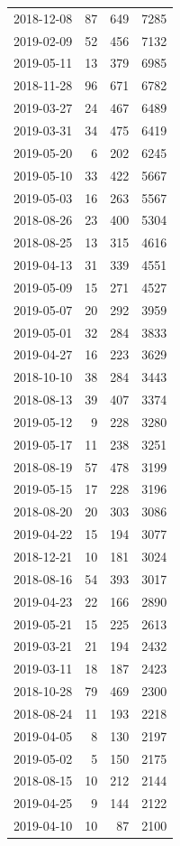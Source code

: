 \begin{tabular}{lrrr}
2018-12-08 & 87 & 649 & 7285 \\
2019-02-09 & 52 & 456 & 7132 \\
2019-05-11 & 13 & 379 & 6985 \\
2018-11-28 & 96 & 671 & 6782 \\
2019-03-27 & 24 & 467 & 6489 \\
2019-03-31 & 34 & 475 & 6419 \\
2019-05-20 & 6 & 202 & 6245 \\
2019-05-10 & 33 & 422 & 5667 \\
2019-05-03 & 16 & 263 & 5567 \\
2018-08-26 & 23 & 400 & 5304 \\
2018-08-25 & 13 & 315 & 4616 \\
2019-04-13 & 31 & 339 & 4551 \\
2019-05-09 & 15 & 271 & 4527 \\
2019-05-07 & 20 & 292 & 3959 \\
2019-05-01 & 32 & 284 & 3833 \\
2019-04-27 & 16 & 223 & 3629 \\
2018-10-10 & 38 & 284 & 3443 \\
2018-08-13 & 39 & 407 & 3374 \\
2019-05-12 & 9 & 228 & 3280 \\
2019-05-17 & 11 & 238 & 3251 \\
2018-08-19 & 57 & 478 & 3199 \\
2019-05-15 & 17 & 228 & 3196 \\
2018-08-20 & 20 & 303 & 3086 \\
2019-04-22 & 15 & 194 & 3077 \\
2018-12-21 & 10 & 181 & 3024 \\
2018-08-16 & 54 & 393 & 3017 \\
2019-04-23 & 22 & 166 & 2890 \\
2019-05-21 & 15 & 225 & 2613 \\
2019-03-21 & 21 & 194 & 2432 \\
2019-03-11 & 18 & 187 & 2423 \\
2018-10-28 & 79 & 469 & 2300 \\
2018-08-24 & 11 & 193 & 2218 \\
2019-04-05 & 8 & 130 & 2197 \\
2019-05-02 & 5 & 150 & 2175 \\
2018-08-15 & 10 & 212 & 2144 \\
2019-04-25 & 9 & 144 & 2122 \\
2019-04-10 & 10 & 87 & 2100 \\

\end{tabular}
